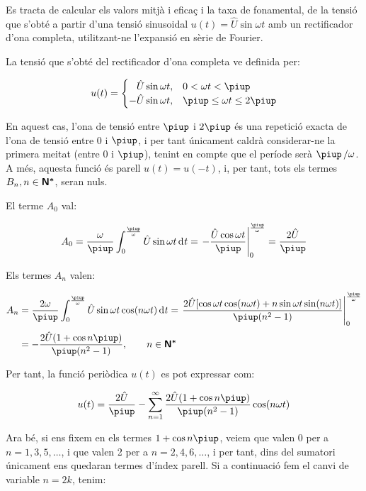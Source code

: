 	
\begin{exemple}[\ValorMitjaEfTaxaFon{}]
	\addcontentsxms{\ValorMitjaEfTaxaFon}
    Es tracta de calcular els valors mitjà i eficaç i la taxa de
    fonamental, de la tensió que s'obté a partir d'una tensió
    sinusoidal $u(t) = \hat{U} \sin\omega t$ amb un rectificador d'ona
    completa, utilitzant-ne l'expansió en sèrie de Fourier.

    La tensió que s'obté del rectificador d'ona completa ve definida
    per:

    \[
    u(t) = \begin{cases} \phantom{-}\hat{U} \sin\omega t, & 0 < \omega t < \piup\\
           -\hat{U} \sin\omega t, & \piup \leq \omega t \leq 2\piup \end{cases}
    \]

    En aquest cas, l'ona de tensió entre $\piup$ i $2\piup$ és una repetició
    exacta de l'ona de tensió entre 0 i $\piup$, i per tant únicament
    caldrà considerar-ne la primera meitat (entre 0 i $\piup$), tenint en
    compte que el període serà $\piup\,/\omega$. A més, aquesta funció és
    parell $u(t) = u(-t)$, i, per tant, tots els termes
    $B_n, n \in {\ensuremath{\boldsymbol{\mathsf{N^*}}}}$, seran nuls.

    El terme $A_0$ val:

    \[
    A_0 = \frac{\omega}{\piup} \int_0^{\frac{\piup}{\omega}} \hat{U} \sin
    \omega t \diff t = \left. -\frac{\hat{U} \cos \omega t}{\piup}
    \right|_0^{\frac{\piup}{\omega}} = \frac{2\hat{U}}{\piup}
    \]

    Els termes $A_n$ valen:

    \[
    \begin{split}
    A_n &= \frac{2 \omega}{\piup} \int_0^{\frac{\piup}{\omega}} \hat{U} \sin
    \omega t \cos(n \omega t)\diff t = \left. \frac{2 \hat{U}[ \cos
    \omega t \cos (n \omega t) + n \sin \omega t \sin(n \omega
    t)]}{\piup(n^2-1)} \right|_0^{\frac{\piup}{\omega}}\\[0.5ex]
    &= -\frac{2\hat{U}(1+\cos n \piup)}{\piup(n^2-1)},
    \qquad n \in \mathsfb{N^*}
    \end{split}
    \]

    Per tant, la funció periòdica $u(t)$ es pot expressar com:

    \[
        u(t) = \frac{2\hat{U}}{\piup} - \sum_{n=1}^\infty
         \frac{2\hat{U}(1+\cos n \piup)}{\piup(n^2-1)} \cos(n \omega t)
    \]

    Ara bé, si ens fixem en els termes $1+\cos n \piup$, veiem que valen 0
    per a $n=1,3,5,\ldots$, i que valen 2 per a $n=2,4,6,\ldots$, i per tant, dins
    del sumatori únicament ens quedaran termes d'índex parell. Si a
    continuació fem el canvi de variable $n=2k$, tenim:


\end{exemple}
